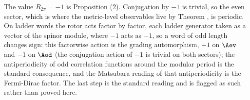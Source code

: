 The value $R_{2\pi} = -1$ is Proposition (2). Conjugation by $-1$ is trivial, so the even sector, which is where the metric-level observables live by Theorem , is periodic. On ladder words the rotor acts factor by factor, each ladder generator taken as a vector of the spinor module, where $-1$ acts as $-1$, so a word of odd length changes sign: this factorwise action is the grading automorphism, $+1$ on $\Aev$ and $-1$ on $\Aod$ (the conjugation action of $-1$ is trivial on both sectors); the antiperiodicity of odd correlation functions around the modular period is the standard consequence, and the Matsubara reading of that antiperiodicity is the Fermi-Dirac factor. The last step is the standard reading and is flagged as such rather than proved here.
